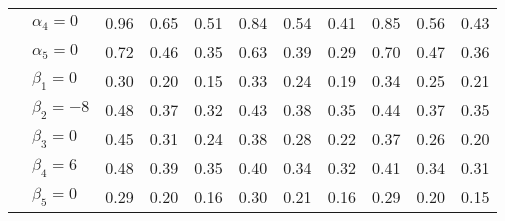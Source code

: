 \begin{table}[htbp]
\begin{tabular}{ll|ccc|ccc|ccc}
  & $\alpha_4=0$ & 0.96 & 0.65 & 0.51 & 0.84 & 0.54 & 0.41 & 0.85 & 0.56 & 0.43 \\ 
  & $\alpha_5=0$ & 0.72 & 0.46 & 0.35 & 0.63 & 0.39 & 0.29 & 0.70 & 0.47 & 0.36 \\ 
  & $\beta_1=0$ & 0.30 & 0.20 & 0.15 & 0.33 & 0.24 & 0.19 & 0.34 & 0.25 & 0.21 \\ 
  & $\beta_2=-8$ & 0.48 & 0.37 & 0.32 & 0.43 & 0.38 & 0.35 & 0.44 & 0.37 & 0.35 \\ 
  & $\beta_3=0$ & 0.45 & 0.31 & 0.24 & 0.38 & 0.28 & 0.22 & 0.37 & 0.26 & 0.20 \\ 
  & $\beta_4=6$ & 0.48 & 0.39 & 0.35 & 0.40 & 0.34 & 0.32 & 0.41 & 0.34 & 0.31 \\ 
  & $\beta_5=0$ & 0.29 & 0.20 & 0.16 & 0.30 & 0.21 & 0.16 & 0.29 & 0.20 & 0.15 \\ 
   \hline
\end{tabular}
\label{tab:rmseP5}
\end{table}

